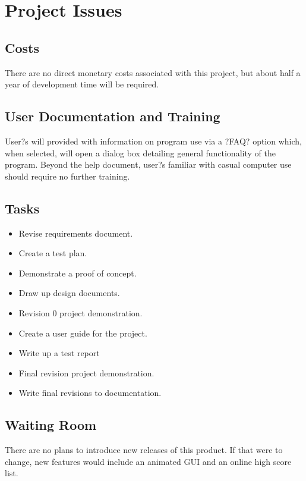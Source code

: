 \documentclass[12pt]{article}
\begin{document}
\section{Project Issues}
\subsection{Costs}
There are no direct monetary costs associated with this project, but about half a year of development
time will be required.\\

\subsection{User Documentation and Training}
User?s will provided with information on program use via a ?FAQ? option which, when selected, will
open a dialog box detailing general functionality of the program.
Beyond the help document, user?s familiar with casual computer use should require no further training.\\

\subsection{Tasks}
\begin{itemize}
\item Revise requirements document.
\item Create a test plan.
\item Demonstrate a proof of concept.
\item Draw up design documents.
\item Revision 0 project demonstration.
\item Create a user guide for the project.
\item Write up a test report
\item Final revision project demonstration.
\item Write final revisions to documentation.
\end{itemize}

\subsection{Waiting Room}
There are no plans to introduce new releases of this product. If that were to change, new features would include an animated GUI and an online high score list. 
\end{document}
